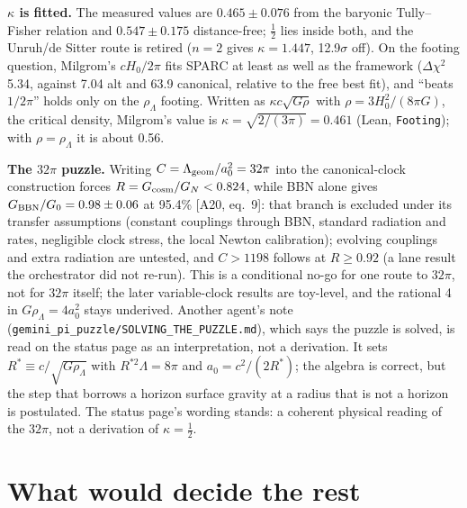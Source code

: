 \documentclass[10pt]{article}
\newcommand{\fpath}[1]{\nolinkurl{#1}}
\begin{document}
\textbf{$\kappa$ is fitted.} The measured values are $0.465\pm0.076$ from the baryonic Tully--Fisher relation and $0.547\pm0.175$ distance-free; $\tfrac12$ lies inside both, and the Unruh/de Sitter route is retired ($n=2$ gives $\kappa=1.447$, 12.9$\sigma$ off). On the footing question, Milgrom's $cH_0/2\pi$ fits SPARC at least as well as the framework ($\Delta\chi^2$ 5.34, against 7.04 alt and 63.9 canonical, relative to the free best fit), and ``beats $1/2\pi$'' holds only on the $\rho_\Lambda$ footing. Written as $\kappa c\sqrt{G\rho}$ with $\rho=3H_0^2/(8\pi G)$, the critical density, Milgrom's value is $\kappa=\sqrt{2/(3\pi)}=0.461$ (Lean, \texttt{Footing}); with $\rho=\rho_\Lambda$ it is about 0.56.

\textbf{The $32\pi$ puzzle.} Writing $C=\Lambda_{\rm geom}/a_0^2=32\pi$ into the canonical-clock construction forces $R=G_{\rm cosm}/G_N<0.824$, while BBN alone gives $G_{\rm BBN}/G_0=0.98\pm0.06$ at 95.4\% [A20, eq.~9]: that branch is excluded under its transfer assumptions (constant couplings through BBN, standard radiation and rates, negligible clock stress, the local Newton calibration); evolving couplings and extra radiation are untested, and $C>1198$ follows at $R\ge0.92$ (a lane result the orchestrator did not re-run). This is a conditional no-go for one route to $32\pi$, not for $32\pi$ itself; the later variable-clock results are toy-level, and the rational 4 in $G\rho_\Lambda=4a_0^2$ stays underived. Another agent's note (\fpath{gemini_pi_puzzle/SOLVING_THE_PUZZLE.md}), which says the puzzle is solved, is read on the status page as an interpretation, not a derivation. It sets $R^*\equiv c/\sqrt{G\rho_\Lambda}$ with $R^{*2}\Lambda=8\pi$ and $a_0=c^2/(2R^*)$; the algebra is correct, but the step that borrows a horizon surface gravity at a radius that is not a horizon is postulated. The status page's wording stands: a coherent physical reading of the $32\pi$, not a derivation of $\kappa=\tfrac12$.

\section{What would decide the rest}\label{sec:decide}
\end{document}
